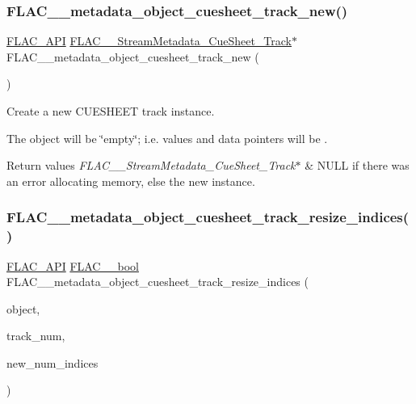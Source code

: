 \subsubsection{\texorpdfstring{FLAC\_\_metadata\_object\_cuesheet\_track\_new()}{FLAC\_\_metadata\_object\_cuesheet\_track\_new()}}
{\footnotesize\ttfamily \mbox{\hyperlink{group__flac__export_ga56ca07df8a23310707732b1c0007d6f5}{F\+L\+A\+C\+\_\+\+A\+PI}} \mbox{\hyperlink{struct_f_l_a_c_____stream_metadata___cue_sheet___track}{F\+L\+A\+C\+\_\+\+\_\+\+Stream\+Metadata\+\_\+\+Cue\+Sheet\+\_\+\+Track}}$\ast$ F\+L\+A\+C\+\_\+\+\_\+metadata\+\_\+object\+\_\+cuesheet\+\_\+track\+\_\+new (\begin{DoxyParamCaption}\item[{\mbox{\hyperlink{_s_d_l__opengles2__gl2ext_8h_ae5d8fa23ad07c48bb609509eae494c95}{void}}}]{ }\end{DoxyParamCaption})}

Create a new C\+U\+E\+S\+H\+E\+ET track instance.

The object will be \char`\"{}empty\char`\"{}; i.\+e. values and data pointers will be {}.


\begin{DoxyRetVals}{Return values}
{\em F\+L\+A\+C\+\_\+\+\_\+\+Stream\+Metadata\+\_\+\+Cue\+Sheet\+\_\+\+Track$\ast$} & {\ttfamily N\+U\+LL} if there was an error allocating memory, else the new instance. \\
\hline
\end{DoxyRetVals}
\mbox{\label{group__flac__metadata__object_ga57dfba89ba704574bde4e3fcd925d473}} 
\subsubsection{\texorpdfstring{FLAC\_\_metadata\_object\_cuesheet\_track\_resize\_indices()}{FLAC\_\_metadata\_object\_cuesheet\_track\_resize\_indices()}}
{\footnotesize\ttfamily \mbox{\hyperlink{group__flac__export_ga56ca07df8a23310707732b1c0007d6f5}{F\+L\+A\+C\+\_\+\+A\+PI}} \mbox{\hyperlink{ordinals_8h_a95103469f1cbd78b8cf250194985b34e}{F\+L\+A\+C\+\_\+\+\_\+bool}} F\+L\+A\+C\+\_\+\+\_\+metadata\+\_\+object\+\_\+cuesheet\+\_\+track\+\_\+resize\+\_\+indices (\begin{DoxyParamCaption}\item[{\mbox{\hyperlink{struct_f_l_a_c_____stream_metadata}{F\+L\+A\+C\+\_\+\+\_\+\+Stream\+Metadata}} $\ast$}]{object,  }\item[{unsigned}]{track\+\_\+num,  }\item[{unsigned}]{new\+\_\+num\+\_\+indices }\end{DoxyParamCaption})}

